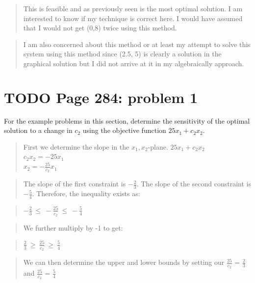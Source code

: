 \documentclass[]{article}
\begin{document}
\begin{quote}
This is feasible and as previously seen is the most optimal solution. I
am interested to know if my technique is correct here. I would have
assumed that I would not get (0,8) twice using this method.
\end{quote}

\begin{quote}
I am also concerned about this method or at least my attempt to solve
this system using this method since (2.5, 5) is clearly a solution in
the graphical solution but I did not arrive at it in my algebraically
approach.
\end{quote}

\section{TODO Page 284: problem 1}\label{todo-page-284-problem-1}

For the example problems in this section, determine the sensitivity of
the optimal solution to a change in \(c_2\) using the objective function
\(25x_1 + c_2x_2\).

\begin{quote}
First we determine the slope in the \(x_1,x_2\)-plane.
\(25x_1 + c_2x_2\)\\
\(c_2x_2 = -25x_1\)\\
\(x_2 = -\frac{25}{c_2}x_1\)
\end{quote}

\begin{quote}
The slope of the first constraint is \(-\frac{2}{3}\). The slope of the
second constraint is \(-\frac{5}{4}\). Therefore, the inequality exists
as:
\end{quote}

\begin{quote}
\(-\frac{2}{3}~\leq~-\frac{25}{c_2}~\leq~-\frac{5}{4}\)
\end{quote}

\begin{quote}
We further multiply by -1 to get:
\end{quote}

\begin{quote}
\(\frac{2}{3}~\geq~\frac{25}{c_2}~\geq~\frac{5}{4}\)
\end{quote}

\begin{quote}
We can then determine the upper and lower bounds by setting our
\(\frac{25}{c_2}\) = \(\frac{2}{3}\) and \(\frac{25}{c_2}\) =
\(\frac{5}{4}\)
\end{quote}
\end{document}
